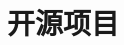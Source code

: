 \documentclass{resume}
\begin{document}









\section{\textcolor{red1}{\faCommenting\ 开源项目}}
\end{document}
